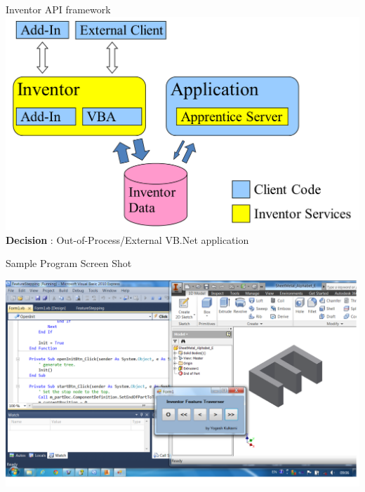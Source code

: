 \begin{frame}{Inventor API framework}
\includegraphics[width=0.9\linewidth]{../Common/images/InventorAPI.png}
\vspace{2mm}
\textbf{Decision} : Out-of-Process/External VB.Net application 
\end{frame}


\begin{frame}{Sample Program Screen Shot}

\includegraphics[width=0.9\linewidth]{../Common/images/ImplSampleProgram.png}
\end{frame}

